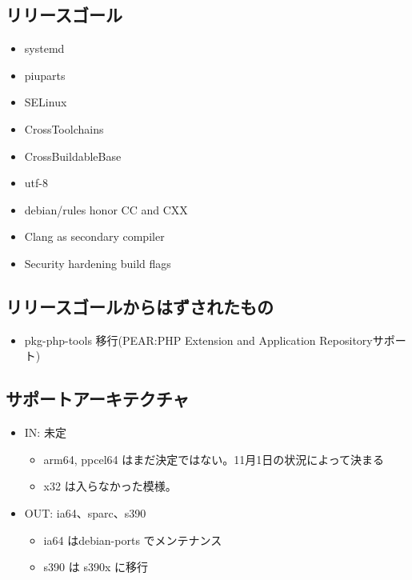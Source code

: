\documentclass[mingoth,a4paper]{jsarticle}
\begin{document}
\subsection{リリースゴール}
\begin{itemize}
\item systemd
\item piuparts
\item SELinux
\item CrossToolchains
\item CrossBuildableBase
\item utf-8
\item debian/rules honor CC and CXX
\item Clang as secondary compiler
\item Security hardening build flags
\end{itemize}



\subsection{リリースゴールからはずされたもの}
\begin{itemize}
\item pkg-php-tools 移行(PEAR:PHP Extension and Application Repositoryサポート)
\end{itemize}


\subsection{サポートアーキテクチャ}

\begin{itemize}
\item IN: 未定
  \begin{itemize}
  \item arm64, ppcel64 はまだ決定ではない。11月1日の状況によって決まる
  \item x32 は入らなかった模様。
  \end{itemize}
\item OUT: ia64、sparc、s390
\begin{itemize}
\item ia64 はdebian-ports でメンテナンス
\item s390 は s390x に移行
\end{itemize}
\end{itemize}
\end{document}
